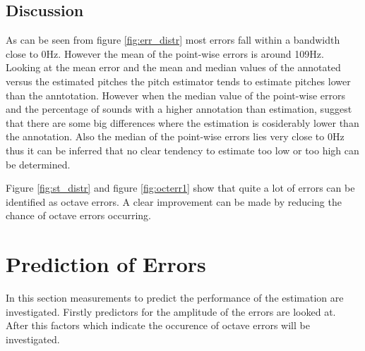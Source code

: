 \documentclass{article}
\begin{document}
\subsection{Discussion}
As can be seen from figure \ref{fig:err_distr} most errors fall within a bandwidth close to 0Hz. However the mean of the point-wise errors is around 109Hz. Looking at the mean error and the mean and median values of the annotated versus the estimated pitches the pitch estimator tends to estimate pitches lower than the anntotation. However when the median value of the point-wise errors and the percentage of sounds with a higher annotation than estimation, suggest that there are some big differences where the estimation is cosiderably lower than the annotation. Also the median of the point-wise errors lies very close to 0Hz thus it can be inferred that no clear tendency to estimate too low or too high can be determined.

Figure \ref{fig:st_distr} and figure \ref{fig:octerr1} show that quite a lot of errors can be identified as octave errors. A clear improvement can be made by reducing the chance of octave errors occurring.

\section{Prediction of Errors}
In this section measurements to predict the performance of the estimation are investigated. Firstly predictors for the amplitude of the errors are looked at. After this factors which indicate the occurence of octave errors will be investigated.
\end{document}
